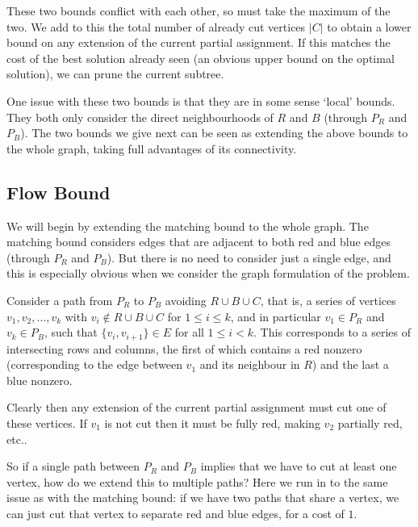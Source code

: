 \documentclass{article}
\begin{document}
	These two bounds conflict with each other, so must take the maximum of the
	two. We add to this the total number of already cut vertices $|C|$ to
	obtain a lower bound on any extension of the current partial assignment.
	If this matches the cost of the best solution already seen (an obvious
	upper bound on the optimal solution), we can prune the current subtree.

	One issue with these two bounds is that they are in some sense `local'
	bounds. They both only consider the direct neighbourhoods of $R$ and $B$
	(through $P_R$ and $P_B$). The two bounds we give next can be seen as
	extending the above bounds to the whole graph, taking full advantages of
	its connectivity.

	\subsection{Flow Bound}

	We will begin by extending the matching bound to the whole graph. The
	matching bound considers edges that are adjacent to both red and blue
	edges (through $P_R$ and $P_B$). But there is no need to consider just
	a single edge, and this is especially obvious when we consider the graph
	formulation of the problem.

	Consider a path from $P_R$ to $P_B$ avoiding $R \cup B \cup C$, that is,
	a series of vertices $v_1, v_2, \dots, v_k$ with
	$v_i \not\in R\cup B\cup C$ for $1 \leq i\leq k$,
	and in particular $v_1 \in P_R$ and $v_k \in P_B$,
	such that $\{v_i, v_{i+1}\} \in E$ for all $1 \leq i < k$. This
	corresponds to a series of intersecting rows and columns, the first of
	which contains a red nonzero (corresponding to the edge between $v_1$ and
	its neighbour in $R$) and the last a blue nonzero.

	Clearly then any extension of the current partial assignment must cut one
	of these vertices. If $v_1$ is not cut then it must be fully red, making
	$v_2$ partially red, etc..


	So if a single path between $P_R$ and $P_B$ implies that we have to cut at
	least one vertex, how do we extend this to multiple paths? Here we run in
	to the same issue as with the matching bound: if we have two paths that
	share a vertex, we can just cut that vertex to separate red and blue edges,
	for a cost of $1$.

\end{document}
